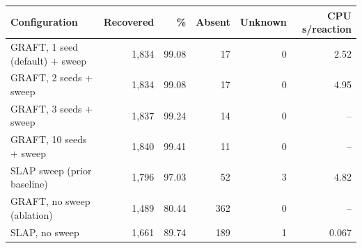 \begin{tabular}{lrrrrr}\toprule
Configuration & Recovered & \% & Absent & Unknown & CPU s/reaction\\\midrule
GRAFT, 1 seed (default) + sweep & 1,834 & 99.08 & 17 & 0 & 2.52 \\
GRAFT, 2 seeds + sweep & 1,834 & 99.08 & 17 & 0 & 4.95 \\
GRAFT, 3 seeds + sweep & 1,837 & 99.24 & 14 & 0 & -- \\
GRAFT, 10 seeds + sweep & 1,840 & 99.41 & 11 & 0 & -- \\
SLAP sweep (prior baseline) & 1,796 & 97.03 & 52 & 3 & 4.82 \\
\midrule
GRAFT, no sweep (ablation) & 1,489 & 80.44 & 362 & 0 & -- \\
SLAP, no sweep & 1,661 & 89.74 & 189 & 1 & 0.067 \\
\bottomrule\end{tabular}
